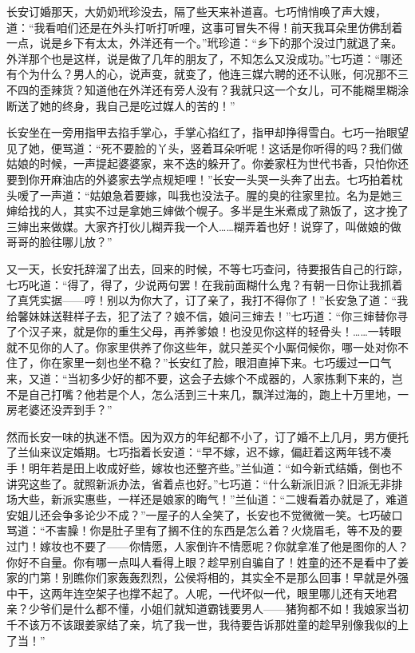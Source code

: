 \par 长安订婚那天，大奶奶玳珍没去，隔了些天来补道喜。七巧悄悄唤了声大嫂，道：“我看咱们还是在外头打听打听哩，这事可冒失不得！前天我耳朵里仿佛刮着一点，说是乡下有太太，外洋还有一个。”玳珍道：“乡下的那个没过门就退了亲。外洋那个也是这样，说是做了几年的朋友了，不知怎么又没成功。”七巧道：“哪还有个为什么？男人的心，说声变，就变了，他连三媒六聘的还不认账，何况那不三不四的歪辣货？知道他在外洋还有旁人没有？我就只这一个女儿，可不能糊里糊涂断送了她的终身，我自己是吃过媒人的苦的！”
\par 长安坐在一旁用指甲去掐手掌心，手掌心掐红了，指甲却挣得雪白。七巧一抬眼望见了她，便骂道：“死不要脸的丫头，竖着耳朵听呢！这话是你听得的吗？我们做姑娘的时候，一声提起婆婆家，来不迭的躲开了。你姜家枉为世代书香，只怕你还要到你开麻油店的外婆家去学点规矩哩！”长安一头哭一头奔了出去。七巧拍着枕头嗳了一声道：“姑娘急着要嫁，叫我也没法子。腥的臭的往家里拉。名为是她三婶给找的人，其实不过是拿她三婶做个幌子。多半是生米煮成了熟饭了，这才挽了三婶出来做媒。大家齐打伙儿糊弄我一个人……糊弄着也好！说穿了，叫做娘的做哥哥的脸往哪儿放？”
\par 又一天，长安托辞溜了出去，回来的时候，不等七巧查问，待要报告自己的行踪，七巧叱道：“得了，得了，少说两句罢！在我前面糊什么鬼？有朝一日你让我抓着了真凭实据——哼！别以为你大了，订了亲了，我打不得你了！”长安急了道：“我给馨妹妹送鞋样子去，犯了法了？娘不信，娘问三婶去！”七巧道：“你三婶替你寻了个汉子来，就是你的重生父母，再养爹娘！也没见你这样的轻骨头！……一转眼就不见你的人了。你家里供养了你这些年，就只差买个小厮伺候你，哪一处对你不住了，你在家里一刻也坐不稳？”长安红了脸，眼泪直掉下来。七巧缓过一口气来，又道：“当初多少好的都不要，这会子去嫁个不成器的，人家拣剩下来的，岂不是自己打嘴？他若是个人，怎么活到三十来几，飘洋过海的，跑上十万里地，一房老婆还没弄到手？”
\par 然而长安一味的执迷不悟。因为双方的年纪都不小了，订了婚不上几月，男方便托了兰仙来议定婚期。七巧指着长安道：“早不嫁，迟不嫁，偏赶着这两年钱不凑手！明年若是田上收成好些，嫁妆也还整齐些。”兰仙道：“如今新式结婚，倒也不讲究这些了。就照新派办法，省着点也好。”七巧道：“什么新派旧派？旧派无非排场大些，新派实惠些，一样还是娘家的晦气！”兰仙道：“二嫂看着办就是了，难道安姐儿还会争多论少不成？”一屋子的人全笑了，长安也不觉微微一笑。七巧破口骂道：“不害臊！你是肚子里有了搁不住的东西是怎么着？火烧眉毛，等不及的要过门！嫁妆也不要了——你情愿，人家倒许不情愿呢？你就拿准了他是图你的人？你好不自量。你有哪一点叫人看得上眼？趁早别自骗自了！姓童的还不是看中了姜家的门第！别瞧你们家轰轰烈烈，公侯将相的，其实全不是那么回事！早就是外强中干，这两年连空架子也撑不起了。人呢，一代坏似一代，眼里哪儿还有天地君亲？少爷们是什么都不懂，小姐们就知道霸钱要男人——猪狗都不如！我娘家当初千不该万不该跟姜家结了亲，坑了我一世，我待要告诉那姓童的趁早别像我似的上了当！”
